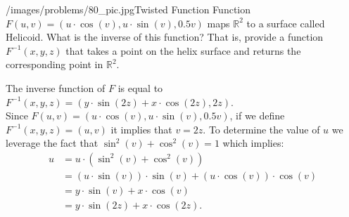 \begin{problem}{/images/problems/80_pic.jpg}{Twisted Function} Function $F(u,v) = (u \cdot \cos(v), u \cdot \sin(v), 0.5 v)$ maps $\mathbb{R}^2$	to a surface called Helicoid.
What is the inverse of this function? That is, provide a function $F^{-1}(x,y,z)$ that takes a point on the helix surface and returns the corresponding point in $\mathbb{R}^2$.
\end{problem}

\begin{solution}
The inverse function of $F$ is equal to $F^{-1}(x,y,z) = (y \cdot \sin(2z) + x \cdot \cos(2z), 2z)$.\\[0.2cm]
Since $F(u,v) = (u \cdot \cos(v), u \cdot \sin(v), 0.5 v)$, if we define $F^{-1}(x,y,z) = (u,v)$ it implies that $v=2z$. To determine the value of $u$ we leverage the fact that $\sin^2(v) + \cos^2(v) = 1$ which implies:
$$\begin{aligned}
	u &= u \cdot (\sin^2(v) + \cos^2(v))\\
	&= (u \cdot \sin(v)) \cdot \sin(v) + (u \cdot \cos(v)) \cdot \cos(v) \\
	&= y \cdot \sin(v) + x \cdot \cos(v) \\
	&= y \cdot \sin(2z) + x \cdot \cos(2z).
\end{aligned} $$
\end{solution}

